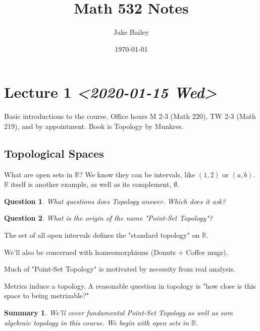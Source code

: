 \documentclass[11pt]{article}
\author{Jake Bailey}
\date{\today}
\title{Math 532 Notes}
\newtheorem{question}{Question}[section]
\newtheorem{summary}{Summary}[section]
\begin{document}
\maketitle
\tableofcontents


\section{Lecture 1 \textit{<2020-01-15 Wed>}}
\label{sec:org630fe20}

Basic introductions to the course. Office hours M 2-3 (Math 220), TW
2-3 (Math 219), and by appointment. Book is Topology by Munkres. 

\subsection{Topological Spaces}
\label{sec:org7e13e86}

What are open sets in \(\mathbb{R}\)? We know they can be intervals,
like \((1,2)\) or \((a,b)\). \(\mathbb{R}\) itself is another example, as
well as its complement, \(\emptyset\).

\begin{question}
What questions does Topology answer. Which does it ask? 
\end{question}

\begin{question}
What is the origin of the name "Point-Set Topology"?
\end{question}

The set of all open intervals defines the "standard topology" on
\(\mathbb{R}\).

We'll also be concerned with homeomorphisms (Donuts + Coffee mugs). 

Much of "Point-Set Topology" is motivated by necessity from real analysis. 

Metrics induce a topology. A reasonable question in topology is "how
close is this space to being metrizable?"

\begin{summary}
We'll cover fundamental Point-Set Topology as well as som algebraic
topology in this course. We begin with open sets in \(\mathbb{R}\).
\end{summary}
\end{document}
